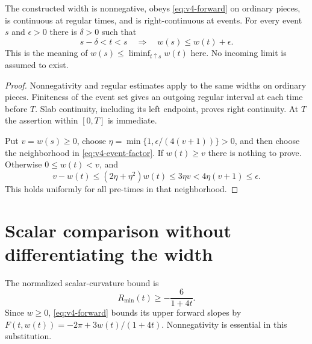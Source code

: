 \begin{proposition}
\label{prop:v4-event-width}
The constructed width is nonnegative, obeys \eqref{eq:v4-forward} on
ordinary pieces, is continuous at regular times, and is right-continuous
at events. For every event $s$ and $\epsilon>0$ there is $\delta>0$
such that
\[
 s-\delta<t<s\quad\Longrightarrow\quad w(s)\leq w(t)+\epsilon.
\]
This is the meaning of $w(s)\leq\liminf_{t\uparrow s}w(t)$ here.
No incoming limit is assumed to exist.
\end{proposition}
\begin{proof}
Nonnegativity and regular estimates apply to the same widths on ordinary
pieces. Finiteness of the event set gives an outgoing regular interval at
each time before $T$. Slab continuity, including its left endpoint,
proves right continuity. At $T$ the assertion within $[0,T]$ is immediate.

Put $v=w(s)\geq0$, choose
$\eta=\min\{1,\epsilon/(4(v+1))\}>0$, and then choose the neighborhood
in \eqref{eq:v4-event-factor}. If $w(t)\geq v$ there is nothing to prove.
Otherwise $0\leq w(t)<v$, and
\[
 v-w(t)\leq(2\eta+\eta^2)w(t)\leq3\eta v
             <4\eta(v+1)\leq\epsilon.
\]
This holds uniformly for all pre-times in that neighborhood.
\end{proof}

\section{Scalar comparison without differentiating the width}

The normalized scalar-curvature bound is
\begin{equation}
 R_{\min}(t)\geq-\frac6{1+4t}.
 \label{eq:v4-scalar-clock}
\end{equation}
Since $w\geq0$, \eqref{eq:v4-forward} bounds its upper forward slopes
by $F(t,w(t))=-2\pi+3w(t)/(1+4t)$. Nonnegativity is essential in
this substitution.

